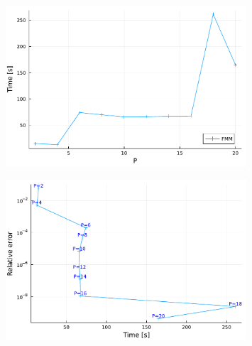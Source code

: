 \documentclass[final,onefignum,onetabnum]{siamart220329}
\begin{document}
\begin{figure}[h!]
\centering
\includegraphics[width=0.8\textwidth]{ptime}
\caption{}
\label{fig:}
\end{figure}
\begin{figure}[h!]
\centering
\includegraphics[width=0.8\textwidth]{ptimeerror}
\caption{}
\label{fig:}
\end{figure}







\end{document}
